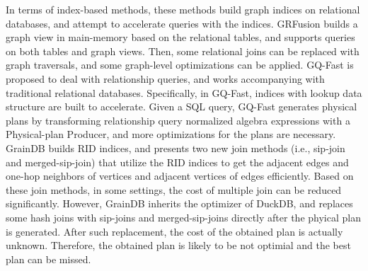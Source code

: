 In terms of index-based methods, these methods build graph indices on relational databases, and attempt to accelerate queries with the indices.
GRFusion \cite{GRFusion} builds a graph view in main-memory based on the relational tables, and supports queries on both tables and graph views.
Then, some relational joins can be replaced with graph traversals, and some graph-level optimizations can be applied.
GQ-Fast \cite{gqfast} is proposed to deal with relationship queries, and works accompanying with traditional relational databases.
Specifically, in GQ-Fast, indices with lookup data structure are built to accelerate.
Given a SQL query, GQ-Fast generates physical plans by transforming relationship query normalized algebra expressions with a Physical-plan Producer, and more optimizations for the plans are necessary.
GrainDB \cite{graindb} builds RID indices, and presents two new join methods (i.e., sip-join and merged-sip-join) that utilize the RID indices to get the adjacent edges and one-hop neighbors of vertices and adjacent vertices of edges efficiently. 
Based on these join methods, in some settings, the cost of multiple join can be reduced significantly.
However, GrainDB inherits the optimizer of DuckDB, and replaces some hash joins with sip-joins and merged-sip-joins directly after the phyical plan is generated.
After such replacement, the cost of the obtained plan is actually unknown.
Therefore, the obtained plan is likely to be not optimial and the best plan can be missed.
